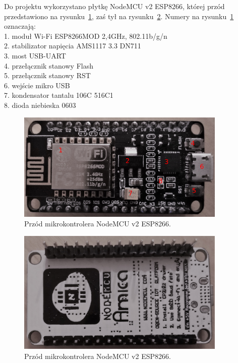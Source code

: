 \documentclass[12p]{article}
\begin{document}
\newpage
Do projektu wykorzystano płytkę NodeMCU v2 ESP8266, której przód przedstawiono na rysunku~\ref{esp}, zaś tył na rysunku~\ref{esp_1}. Numery na rysunku~\ref{esp} oznaczają:\\ 
1. moduł Wi-Fi ESP8266MOD 2,4GHz, 802.11b/g/n\\
2. stabilizator napięcia AMS1117 3.3 DN711\\
3. most USB-UART\\
4. przełącznik stanowy Flash\\
5. przełącznik stanowy RST\\
6. wejście mikro USB\\
7. kondensator tantalu 106C 516C1\\
8. dioda niebieska 0603\\

\begin{figure}[H]
\centering
\includegraphics[width=10cm]{esp.png}
\caption{Przód mikrokontrolera NodeMCU v2 ESP8266.}\label{esp}
\end{figure}

\begin{figure}[H]
\centering
\includegraphics[width=10cm]{esp8266_1.jpg}
\caption{Przód mikrokontrolera NodeMCU v2 ESP8266.}\label{esp_1}
\end{figure}
\newpage
\end{document}
